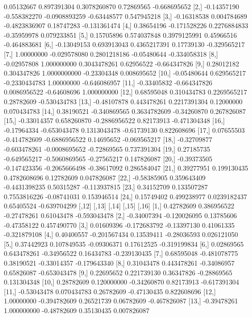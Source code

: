 \documentclass[a4paper]{ article}
\begin{document}
\begin{table}[H]
\begin{Schunk}
\begin{Soutput}
 [1,]  0.05132667  0.897391304  0.3078260870  0.72869565 -0.668695652
 [2,] -0.14357190 -0.558382270 -0.0908893259 -0.63448577  0.547945218
 [3,] -0.16318538  0.004784689 -0.4823836907  0.18747283 -0.131361474
 [4,]  0.38654196 -0.171528226  0.2276884833 -0.35959978  0.079233851
 [5,]  0.15705896  0.574037848  0.3979125991  0.45966516 -0.464883681
 [6,] -0.13049153  0.693913043  0.4365217391  0.17739130 -0.329565217
 [7,]  1.00000000 -0.029578080  0.2801218186 -0.05480644 -0.334058318
 [8,] -0.02957808  1.000000000  0.3043478261  0.62956522 -0.664347826
 [9,]  0.28012182  0.304347826  1.0000000000 -0.23304348  0.008695652
[10,] -0.05480644  0.629565217 -0.2330434783  1.00000000 -0.646086957
[11,] -0.33405832 -0.664347826  0.0086956522 -0.64608696  1.000000000
[12,]  0.68595048  0.310434783  0.2269565217  0.28782609 -0.530434783
[13,] -0.48107878  0.443478261  0.2217391304  0.12000000  0.070434783
[14,]  0.38190521 -0.340869565  0.3634782609 -0.34260870  0.267826087
[15,] -0.33014357  0.658260870 -0.2886956522  0.82173913 -0.471304348
[16,] -0.17964334 -0.653043478  0.1313043478 -0.61739130  0.822608696
[17,]  0.07655503 -0.414782609 -0.6886956522  0.14695652 -0.069565217
[18,] -0.32709877 -0.603478261 -0.0008695652 -0.72869565  0.737391304
[19,]  0.27185735 -0.649565217 -0.5060869565 -0.27565217  0.147826087
[20,] -0.39373505 -0.147423356 -0.2065666498 -0.38617092  0.286584047
[21,]  0.39277951  0.199130435  0.4782608696  0.12782609  0.047826087
[22,] -0.58385905  0.359643409 -0.4431398235  0.50315287 -0.113937815
[23,]  0.34152709  0.133507287  0.7553816226 -0.08741031  0.153946514
[24,]  0.15749402  0.499238977  0.0239182437  0.65405524 -0.639704299
            [,12]        [,13]       [,14]       [,15]        [,16]
 [1,]  0.42782609  0.386956522 -0.27478261  0.61043478 -0.593043478
 [2,] -0.34007394 -0.120026095  0.13785606 -0.47358122  0.457490770
 [3,]  0.01609396 -0.172683792 -0.13397130  0.41061335 -0.321879108
 [4,]  0.40400557 -0.201567434  0.13539411 -0.28036593  0.026121050
 [5,]  0.37442923  0.107849535 -0.09306371  0.17612525 -0.319199834
 [6,]  0.02869565  0.643478261 -0.34956522  0.16434783 -0.239130435
 [7,]  0.68595048 -0.481078775  0.38190521 -0.33014357 -0.179643340
 [8,]  0.31043478  0.443478261 -0.34086957  0.65826087 -0.653043478
 [9,]  0.22695652  0.221739130  0.36347826 -0.28869565  0.131304348
[10,]  0.28782609  0.120000000 -0.34260870  0.82173913 -0.617391304
[11,] -0.53043478  0.070434783  0.26782609 -0.47130435  0.822608696
[12,]  1.00000000 -0.394782609  0.26521739  0.06782609 -0.467826087
[13,] -0.39478261  1.000000000 -0.48782609  0.35130435  0.007826087

\end{Soutput}
\end{Schunk}
\end{table}
\end{document}
